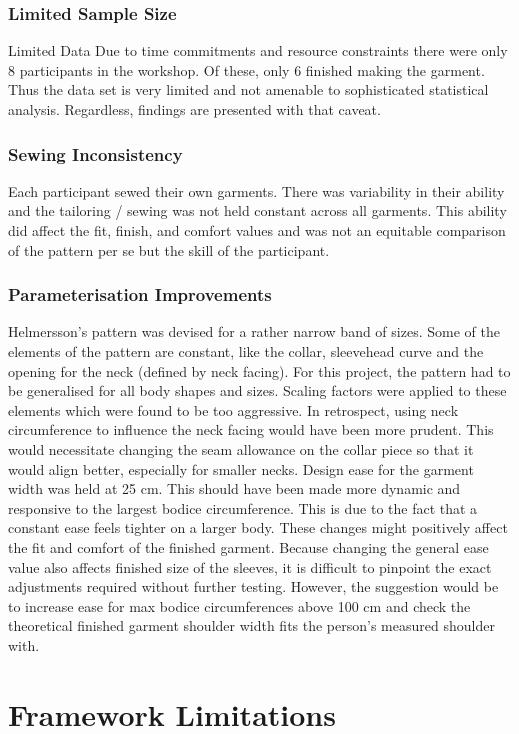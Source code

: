 \subsubsection{Limited Sample Size}
Limited Data
Due to time commitments and resource constraints there were only 8 participants in the workshop. Of these, only 6 finished making the garment. Thus the data set is very limited and not amenable to sophisticated statistical analysis. Regardless, findings are presented with that caveat.
\subsubsection{Sewing Inconsistency}

Each participant sewed their own garments. There was variability in their ability and the tailoring / sewing was not held constant across all garments. This ability did affect the fit, finish, and comfort values and was not an equitable comparison of the pattern per se but the skill of the participant.

\subsubsection{Parameterisation Improvements}
Helmersson’s pattern was devised for a rather narrow band of sizes. Some of the elements of the pattern are constant, like the collar, sleevehead curve and the opening for the neck (defined by neck facing). For this project, the pattern had to be generalised for all body shapes and sizes. Scaling factors were applied to these elements which were found to be too aggressive. In retrospect, using neck circumference to influence the neck facing would have been more prudent. This would necessitate changing the seam allowance on the collar piece so that it would align better, especially for smaller necks.
Design ease for the garment width was held at 25 cm. This should have been made more dynamic and responsive to the largest bodice circumference. This is due to the fact that a constant ease feels tighter on a larger body. These changes might positively affect the fit and comfort of the finished garment. Because changing the general ease value also affects finished size of the sleeves, it is difficult to pinpoint the exact adjustments required without further testing. However, the suggestion would be to increase ease for max bodice circumferences above 100 cm and check the theoretical finished garment shoulder width fits the person's measured shoulder with.

\section{Framework Limitations}

